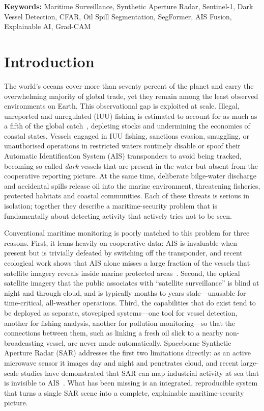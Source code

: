 \documentclass[a4paper,11pt]{article}
\begin{document}
\medskip
\noindent\textbf{Keywords:} Maritime Surveillance, Synthetic Aperture Radar,
Sentinel-1, Dark Vessel Detection, CFAR, Oil Spill Segmentation, SegFormer,
AIS Fusion, Explainable AI, Grad-CAM

\section{Introduction}

The world's oceans cover more than seventy percent of the planet and carry the
overwhelming majority of global trade, yet they remain among the least observed
environments on Earth. This observational gap is exploited at scale. Illegal,
unreported and unregulated (IUU) fishing is estimated to account for as much as a
fifth of the global catch~\cite{agnew2009}, depleting stocks and undermining the
economies of coastal states. Vessels engaged in IUU fishing, sanctions evasion, smuggling, or
unauthorised operations in restricted waters routinely disable or spoof their
Automatic Identification System (AIS) transponders to avoid being tracked, becoming
so-called \emph{dark} vessels that are present in the water but absent from the
cooperative reporting picture. At the same time, deliberate bilge-water discharge
and accidental spills release oil into the marine environment, threatening
fisheries, protected habitats and coastal communities. Each of these threats is
serious in isolation; together they describe a maritime-security problem that is
fundamentally about detecting activity that actively tries not to be seen.

Conventional maritime monitoring is poorly matched to this problem for three
reasons. First, it leans heavily on cooperative data: AIS is invaluable when present
but is trivially defeated by switching off the transponder, and recent ecological
work shows that AIS alone misses a large fraction of the vessels that satellite
imagery reveals inside marine protected areas~\cite{raynor2025science}. Second, the optical
satellite imagery that the public associates with ``satellite surveillance'' is
blind at night and through cloud, and is typically months to years stale---unusable
for time-critical, all-weather operations. Third, the capabilities that do exist
tend to be deployed as separate, stovepiped systems---one tool for vessel detection,
another for fishing analysis, another for pollution monitoring---so that the
connections between them, such as linking a fresh oil slick to a nearby
non-broadcasting vessel, are never made automatically. Spaceborne Synthetic Aperture
Radar (SAR) addresses the first two limitations directly: as an active microwave
sensor it images day and night and penetrates cloud, and recent large-scale studies
have demonstrated that SAR can map industrial activity at sea that is invisible to
AIS~\cite{paolo2024nature}. What has been missing is an integrated, reproducible system
that turns a single SAR scene into a complete, explainable maritime-security
picture.
\end{document}
